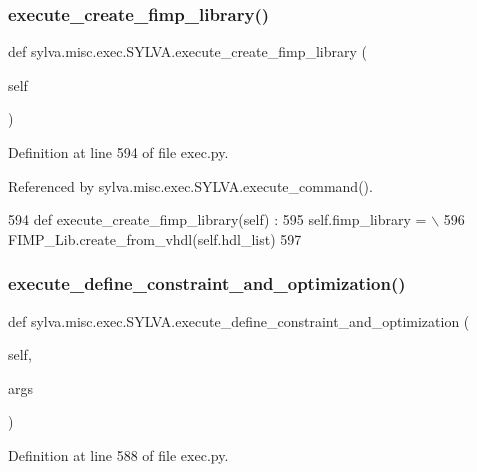 \subsubsection{\texorpdfstring{execute\+\_\+create\+\_\+fimp\+\_\+library()}{execute\_create\_fimp\_library()}}
{\footnotesize\ttfamily def sylva.\+misc.\+exec.\+S\+Y\+L\+V\+A.\+execute\+\_\+create\+\_\+fimp\+\_\+library (\begin{DoxyParamCaption}\item[{}]{self }\end{DoxyParamCaption})}



Definition at line 594 of file exec.\+py.



Referenced by sylva.\+misc.\+exec.\+S\+Y\+L\+V\+A.\+execute\+\_\+command().


\begin{DoxyCode}
594   \textcolor{keyword}{def }execute\_create\_fimp\_library(self) :
595     self.fimp\_library = \(\backslash\)
596     FIMP\_Lib.create\_from\_vhdl(self.hdl\_list)
597 
\end{DoxyCode}
\mbox{\label{classsylva_1_1misc_1_1exec_1_1_s_y_l_v_a_a651252c9a7f6009f4c9647abab5d4651}} 
\subsubsection{\texorpdfstring{execute\+\_\+define\+\_\+constraint\+\_\+and\+\_\+optimization()}{execute\_define\_constraint\_and\_optimization()}}
{\footnotesize\ttfamily def sylva.\+misc.\+exec.\+S\+Y\+L\+V\+A.\+execute\+\_\+define\+\_\+constraint\+\_\+and\+\_\+optimization (\begin{DoxyParamCaption}\item[{}]{self,  }\item[{}]{args }\end{DoxyParamCaption})}



Definition at line 588 of file exec.\+py.



